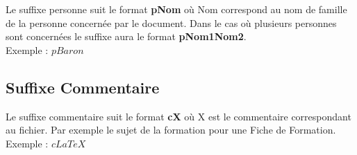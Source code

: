 Le suffixe personne suit le format \textbf{pNom} où Nom correspond au nom de famille de la personne concernée par le document. Dans le cas où plusieurs personnes sont concernées le suffixe aura le format \textbf{pNom1Nom2}.\\

Exemple : $pBaron$

\subsection{Suffixe Commentaire}
\label{suffixe_commentaire}

Le suffixe commentaire suit le format \textbf{cX} où X est le commentaire correspondant au fichier. Par exemple le sujet de la formation pour une Fiche de Formation.\\

Exemple : $cLaTeX$

